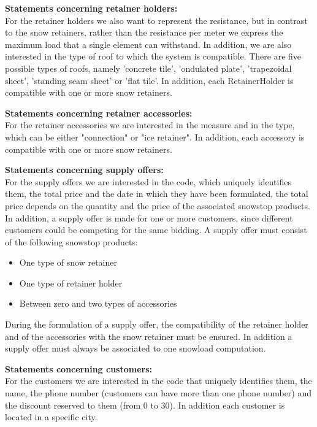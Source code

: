 \documentclass{article}[h]
\begin{document}
\vspace{12px}
\textbf{Statements concerning retainer holders:\\}
For the retainer holders we also want to represent the resistance, but in contrast to the snow retainers, rather than the resistance per meter we express the maximum load that a single element can withstand. In addition, we are also interested in the type of roof to which the system is compatible. There are five possible types of roofs, namely 'concrete tile', 'ondulated plate', 'trapezoidal sheet', 'standing seam sheet' or 'flat tile'. In addition, each RetainerHolder is compatible with one or more snow retainers.

\vspace{12px}
\textbf{Statements concerning retainer accessories:\\}
For the retainer accessories we are interested in the measure and in the type, which can be either "connection" or "ice retainer". In addition, each accessory is compatible with one or more snow retainers.

\vspace{12px}
\textbf{Statements concerning supply offers:\\}
For the supply offers we are interested in the code, which uniquely identifies them, the total price and the date in which they have been formulated, the total price depends on the quantity and the price of the associated snowstop products. In addition, a supply offer is made for one or more customers, since different customers could be competing for the same bidding. A supply offer must consist of the following snowstop products:
\begin{itemize}
   \item One type of snow retainer
   \item One type of retainer holder
   \item Between zero and two types of accessories
\end{itemize}
During the formulation of a supply offer, the compatibility of the retainer holder and of the accessories with the snow retainer must be ensured. In addition a supply offer must always be associated to one snowload computation.

\vspace{12px}
\textbf{Statements concerning customers:\\}
For the customers we are interested in the code that uniquely identifies them, the name, the phone number (customers can have more than one phone number) and the discount reserved to them (from 0 to 30). In addition each customer is located in a specific city.
\end{document}
